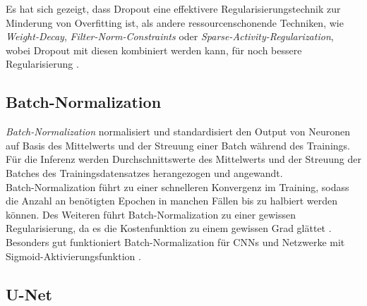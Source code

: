 Es hat sich gezeigt, dass Dropout eine effektivere Regularisierungstechnik zur Minderung von Overfitting ist, 
als andere ressourcenschonende Techniken, wie \textit{Weight-Decay}, \textit{Filter-Norm-Constraints} oder 
\textit{Sparse-Activity-Regularization}, wobei Dropout mit diesen kombiniert werden kann, für noch bessere 
Regularisierung \cites[S.~265]{Goodfellow.2016}.

\subsection{Batch-Normalization} \label{sec:architekturkomponenten:batchnorm}

\textit{Batch-Normalization} normalisiert und standardisiert den Output von Neuronen auf Basis des Mittelwerts 
und der Streuung einer Batch während des Trainings. Für die Inferenz werden Durchschnittswerte 
des Mittelwerts und der Streuung der Batches des Trainingsdatensatzes herangezogen und angewandt. \\
Batch-Normalization führt zu einer schnelleren Konvergenz im Training, 
sodass die Anzahl an benötigten Epochen in manchen Fällen bis zu halbiert werden können. Des Weiteren führt 
Batch-Normalization zu einer gewissen Regularisierung, da es die Kostenfunktion zu einem gewissen Grad glättet 
\cites[S.~317--320]{Goodfellow.2016}{Ioffe.11022015}.
Besonders gut funktioniert Batch-Normalization für \acp{CNN} und Netzwerke mit Sigmoid-Aktivierungsfunktion
\cites[S.~425]{Goodfellow.2016}.

\subsection{U-Net} \label{sec:architekturkomponenten:unet}

